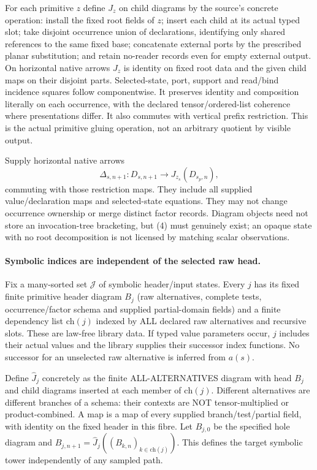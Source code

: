 \documentclass[11pt]{article}
\begin{document}
For each primitive $z$ define $J_z$ on child diagrams by the source's concrete operation: install the fixed root fields of $z$; insert each child at its actual typed slot; take disjoint occurrence union of declarations, identifying only shared references to the same fixed base; concatenate external ports by the prescribed planar substitution; and retain no-reader records even for empty external output. On horizontal native arrows $J_z$ is identity on fixed root data and the given child maps on their disjoint parts. Selected-state, port, support and read/bind incidence squares follow componentwise. It preserves identity and composition literally on each occurrence, with the declared tensor/ordered-list coherence where presentations differ. It also commutes with vertical prefix restriction. This is the actual primitive gluing operation, not an arbitrary quotient by visible output.

Supply horizontal native arrows
\[
 \Delta_{s,n+1}:D_{s,n+1}\longrightarrow J_{z_s}(D_{s_p,n}), \tag{4}
\]
commuting with those restriction maps. They include all supplied value/declaration maps and selected-state equations. They may not change occurrence ownership or merge distinct factor records. Diagram objects need not store an invocation-tree bracketing, but (4) must genuinely exist; an opaque state with no root decomposition is not licensed by matching scalar observations.

\paragraph{Symbolic indices are independent of the selected raw head.}
Fix a many-sorted set $\mathcal J$ of symbolic header/input states. Every $j$ has its fixed finite primitive header diagram $B_j$ (raw alternatives, complete tests, occurrence/factor schema and supplied partial-domain fields) and a finite dependency list $\mathrm{ch}(j)$ indexed by ALL declared raw alternatives and recursive slots. These are law-free library data. If typed value parameters occur, $j$ includes their actual values and the library supplies their successor index functions. No successor for an unselected raw alternative is inferred from $a(s)$.

Define $\widehat J_j$ concretely as the finite ALL-ALTERNATIVES diagram with head $B_j$ and child diagrams inserted at each member of $\mathrm{ch}(j)$. Different alternatives are different branches of a schema: their contexts are NOT tensor-multiplied or product-combined. A map is a map of every supplied branch/test/partial field, with identity on the fixed header in this fibre. Let $B_{j,0}$ be the specified hole diagram and $B_{j,n+1}=\widehat J_j((B_{k,n})_{k\in\mathrm{ch}(j)})$. This defines the target symbolic tower independently of any sampled path.
\end{document}

